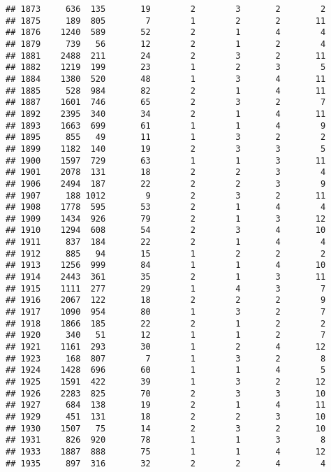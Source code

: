\documentclass[]{article}
\begin{document}
\begin{verbatim}
## 1873     636  135       19        2        3       2        2
## 1875     189  805        7        1        2       2       11
## 1876    1240  589       52        2        1       4        4
## 1879     739   56       12        2        1       2        4
## 1881    2488  211       24        2        3       2       11
## 1882    1219  199       23        1        2       3        5
## 1884    1380  520       48        1        3       4       11
## 1885     528  984       82        2        1       4       11
## 1887    1601  746       65        2        3       2        7
## 1892    2395  340       34        2        1       4       11
## 1893    1663  699       61        1        1       4        9
## 1895     855   49       11        1        3       2        2
## 1899    1182  140       19        2        3       3        5
## 1900    1597  729       63        1        1       3       11
## 1901    2078  131       18        2        2       3        4
## 1906    2494  187       22        2        2       3        9
## 1907     188 1012        9        2        3       2       11
## 1908    1778  595       53        2        1       4        4
## 1909    1434  926       79        2        1       3       12
## 1910    1294  608       54        2        3       4       10
## 1911     837  184       22        2        1       4        4
## 1912     885   94       15        1        2       2        2
## 1913    1256  999       84        1        1       4       10
## 1914    2443  361       35        2        1       3       11
## 1915    1111  277       29        1        4       3        7
## 1916    2067  122       18        2        2       2        9
## 1917    1090  954       80        1        3       2        7
## 1918    1866  185       22        2        1       2        2
## 1920     340   51       12        1        1       2        7
## 1921    1161  293       30        1        2       4       12
## 1923     168  807        7        1        3       2        8
## 1924    1428  696       60        1        1       4        5
## 1925    1591  422       39        1        3       2       12
## 1926    2283  825       70        2        3       3       10
## 1927     684  138       19        2        1       4       11
## 1929     451  131       18        2        2       3       10
## 1930    1507   75       14        2        3       2       10
## 1931     826  920       78        1        1       3        8
## 1933    1887  888       75        1        1       4       12
## 1935     897  316       32        2        2       4        4

\end{verbatim}
\end{document}
